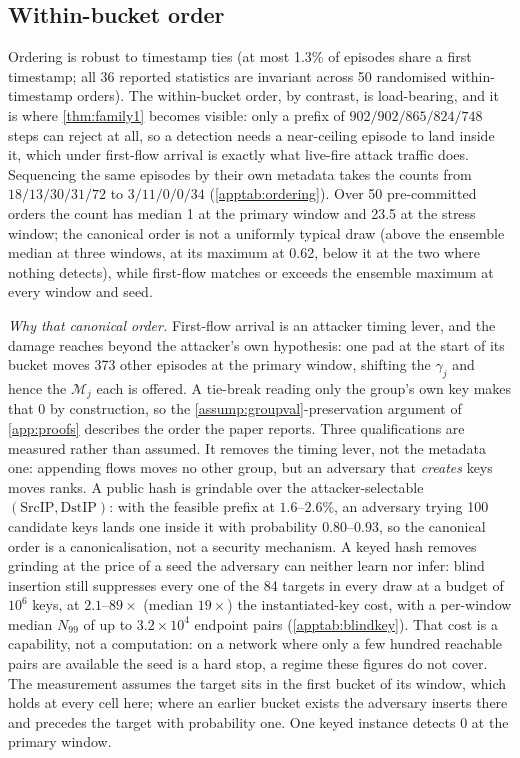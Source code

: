 \documentclass[conference]{IEEEtran}
\begin{document}


\subsection{Within-bucket order}\label{sec:transfer}

Ordering is robust to timestamp ties (at most 1.3\% of episodes share a first timestamp; all 36 reported
statistics are invariant across 50 randomised within-timestamp orders). The within-bucket order, by
contrast, is load-bearing, and it is where \cref{thm:family1} becomes visible: only a prefix of
$902/902/865/824/748$ steps can reject at all, so a detection needs a near-ceiling episode to land inside
it, which under first-flow arrival is exactly what live-fire attack traffic does. Sequencing the same
episodes by their own metadata takes the counts from $18/13/30/31/72$ to $3/11/0/0/34$
(\cref{apptab:ordering}). Over 50 pre-committed orders the count has median 1 at the primary window and
23.5 at the stress window; the canonical order is not a uniformly typical draw (above the ensemble median
at three windows, at its maximum at 0.62, below it at the two where nothing detects), while first-flow
matches or exceeds the ensemble maximum at every window and seed.

\emph{Why that canonical order.} First-flow arrival is an attacker timing lever, and the damage reaches
beyond the attacker's own hypothesis: one pad at the start of its bucket moves 373 other episodes at the primary
window, shifting the $\gamma_j$ and hence the $\mathcal M_j$ each is offered. A tie-break reading only the
group's own key makes that 0 by construction, so the \cref{assump:groupval}-preservation argument of
\cref{app:proofs} describes the order the paper reports. Three qualifications are measured rather than
assumed. It removes the timing lever, not the metadata one: appending flows moves no other group, but an
adversary that \emph{creates} keys moves ranks. A public hash is grindable over the attacker-selectable
$(\mathrm{SrcIP},\mathrm{DstIP})$: with the feasible prefix at $1.6$--$2.6\%$, an adversary trying 100
candidate keys lands one inside it with probability $0.80$--$0.93$, so the canonical order is a
canonicalisation, not a security mechanism. A keyed hash removes grinding at the price of a seed the
adversary can neither learn nor infer: blind insertion still suppresses every one of the 84 targets in
every draw at a budget of $10^{6}$ keys, at $2.1$--$89\times$ (median $19\times$) the instantiated-key
cost, with a per-window median $N_{99}$ of up to $3.2\times10^{4}$ endpoint pairs
(\cref{apptab:blindkey}). That cost is a
capability, not a computation: on a network where only a few hundred reachable pairs are available the
seed is a hard stop, a regime these figures do not cover. The measurement assumes the target sits in the
first bucket of its window, which holds at every cell here; where an earlier bucket exists the adversary
inserts there and precedes the target with probability one. One keyed instance detects 0 at the primary
window.
\end{document}
